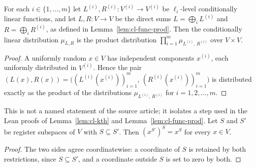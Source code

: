 \begin{lemma}\label{lem:cl-dist-prod}
	\leanok
	For each $i \in \{1, \dots, m\}$ let $L^{(i)}, R^{(i)} \colon V^{(i)} \to V^{(i)}$ be $\ell_i$-level conditionally linear functions, and let $L, R \colon V \to V$ be the direct sums $L = \bigoplus_i L^{(i)}$ and $R = \bigoplus_i R^{(i)}$, as defined in Lemma~\ref{lem:cl-func-prod}. Then the conditionally linear distribution $\mu_{L,R}$ is the product distribution $\prod_{i=1}^m \mu_{L^{(i)},\,R^{(i)}}$ over $V \times V$.
\end{lemma}
\begin{proof}
	\leanok
	A uniformly random $x \in V$ has independent components $x^{(i)}$, each uniformly distributed in $V^{(i)}$. Hence the pair $(L(x), R(x)) = \bigl( (L^{(i)}(x^{(i)}))_{i=1}^m,\, (R^{(i)}(x^{(i)}))_{i=1}^m \bigr)$ is distributed exactly as the product of the distributions $\mu_{L^{(i)},\,R^{(i)}}$ for $i = 1, 2, \dots, m$.
\end{proof}

\begin{lemma}\label{lem:cl-restriction-idem}
	\leanok
	This is not a named statement of the source article; it isolates a step used in the Lean proofs of Lemma~\ref{lem:cl-kth} and Lemma~\ref{lem:cl-func-prod}. Let $S$ and $S'$ be register subspaces of $V$ with $S \subseteq S'$. Then $(x^{S'})^S = x^S$ for every $x \in V$.
\end{lemma}
\begin{proof}
	\leanok
	The two sides agree coordinatewise: a coordinate of $S$ is retained by both restrictions, since $S \subseteq S'$, and a coordinate outside $S$ is set to zero by both.
\end{proof}

